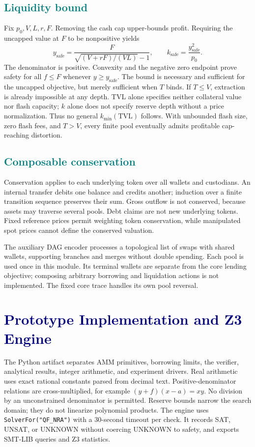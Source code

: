 \documentclass[conference]{IEEEtran}
\begin{document}
\subsection{\textcolor{Teal}{Liquidity bound}}
Fix $p_0,V,L,r,F$. Removing the cash cap upper-bounds profit. Requiring the
uncapped value at $F$ to be nonpositive yields
\begin{equation}
y_{\mathrm{safe}}=\frac{F}{\sqrt{(V+rF)/(VL)}-1},\qquad
k_{\mathrm{safe}}=\frac{y_{\mathrm{safe}}^2}{p_0}.
\end{equation}
The denominator is positive. Convexity and the negative zero endpoint prove
safety for all $f\leq F$ whenever $y\geq y_{\mathrm{safe}}$. The bound is
necessary and sufficient for the uncapped objective, but merely sufficient
when $T$ binds. If $T\leq V$, extraction is already impossible at any depth.
TVL alone specifies neither collateral value nor flash capacity; $k$ alone
does not specify reserve depth without a price normalization. Thus no general
$k_{\min}(\mathrm{TVL})$ follows. With unbounded flash size, zero flash fees,
and $T>V$, every finite pool eventually admits profitable cap-reaching distortion.

\subsection{\textcolor{Teal}{Composable conservation}}
Conservation applies to each underlying token over all wallets and custodians.
An internal transfer debits one balance and credits another; induction over a
finite transition sequence preserves their sum. Gross outflow is not conserved,
because assets may traverse several pools. Debt claims are not new underlying
tokens. Fixed reference prices permit weighting token conservation, while
manipulated spot prices cannot define the conserved valuation.

The auxiliary DAG encoder processes a topological list of swaps with shared
wallets, supporting branches and merges without double spending. Each pool is
used once in this module. Its terminal wallets are separate from the core
lending objective; composing arbitrary borrowing and liquidation actions is
not implemented. The fixed core trace handles its own pool reversal.

\section{\textcolor{Navy}{Prototype Implementation and Z3 Engine}}
The Python artifact separates AMM primitives, borrowing limits, the verifier,
analytical results, integer arithmetic, and experiment drivers. Real arithmetic
uses exact rational constants parsed from decimal text. Positive-denominator
relations are cross-multiplied, for example
$(y+f)(x-a)=xy$. No division by an unconstrained denominator is permitted.
Reserve bounds narrow the search domain; they do not linearize polynomial
products. The engine uses \texttt{SolverFor("QF\_NRA")} with a 30-second
timeout per check. It records SAT, UNSAT, or UNKNOWN without coercing UNKNOWN
to safety, and exports SMT-LIB queries and Z3 statistics.
\end{document}
